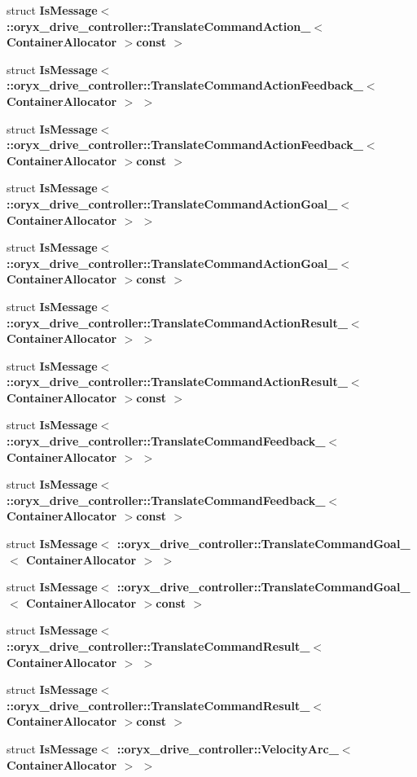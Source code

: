 \begin{DoxyCompactItemize}
struct {\bf \-Is\-Message$<$ \-::oryx\-\_\-drive\-\_\-controller\-::\-Translate\-Command\-Action\-\_\-$<$ Container\-Allocator $>$const  $>$}
\item 
struct {\bf \-Is\-Message$<$ \-::oryx\-\_\-drive\-\_\-controller\-::\-Translate\-Command\-Action\-Feedback\-\_\-$<$ Container\-Allocator $>$ $>$}
\item 
struct {\bf \-Is\-Message$<$ \-::oryx\-\_\-drive\-\_\-controller\-::\-Translate\-Command\-Action\-Feedback\-\_\-$<$ Container\-Allocator $>$const  $>$}
\item 
struct {\bf \-Is\-Message$<$ \-::oryx\-\_\-drive\-\_\-controller\-::\-Translate\-Command\-Action\-Goal\-\_\-$<$ Container\-Allocator $>$ $>$}
\item 
struct {\bf \-Is\-Message$<$ \-::oryx\-\_\-drive\-\_\-controller\-::\-Translate\-Command\-Action\-Goal\-\_\-$<$ Container\-Allocator $>$const  $>$}
\item 
struct {\bf \-Is\-Message$<$ \-::oryx\-\_\-drive\-\_\-controller\-::\-Translate\-Command\-Action\-Result\-\_\-$<$ Container\-Allocator $>$ $>$}
\item 
struct {\bf \-Is\-Message$<$ \-::oryx\-\_\-drive\-\_\-controller\-::\-Translate\-Command\-Action\-Result\-\_\-$<$ Container\-Allocator $>$const  $>$}
\item 
struct {\bf \-Is\-Message$<$ \-::oryx\-\_\-drive\-\_\-controller\-::\-Translate\-Command\-Feedback\-\_\-$<$ Container\-Allocator $>$ $>$}
\item 
struct {\bf \-Is\-Message$<$ \-::oryx\-\_\-drive\-\_\-controller\-::\-Translate\-Command\-Feedback\-\_\-$<$ Container\-Allocator $>$const  $>$}
\item 
struct {\bf \-Is\-Message$<$ \-::oryx\-\_\-drive\-\_\-controller\-::\-Translate\-Command\-Goal\-\_\-$<$ Container\-Allocator $>$ $>$}
\item 
struct {\bf \-Is\-Message$<$ \-::oryx\-\_\-drive\-\_\-controller\-::\-Translate\-Command\-Goal\-\_\-$<$ Container\-Allocator $>$const  $>$}
\item 
struct {\bf \-Is\-Message$<$ \-::oryx\-\_\-drive\-\_\-controller\-::\-Translate\-Command\-Result\-\_\-$<$ Container\-Allocator $>$ $>$}
\item 
struct {\bf \-Is\-Message$<$ \-::oryx\-\_\-drive\-\_\-controller\-::\-Translate\-Command\-Result\-\_\-$<$ Container\-Allocator $>$const  $>$}
\item 
struct {\bf \-Is\-Message$<$ \-::oryx\-\_\-drive\-\_\-controller\-::\-Velocity\-Arc\-\_\-$<$ Container\-Allocator $>$ $>$}
\item 

\end{DoxyCompactItemize}
